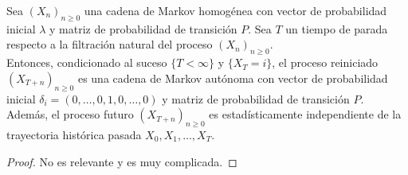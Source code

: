 \begin{teo}
    Sea $(X_n)_{n \geq 0}$ una cadena de Markov homogénea con vector de probabilidad inicial $\lambda$ y matriz de probabilidad de transición $P$. Sea $T$ un tiempo de parada respecto a la filtración natural del proceso $(X_n)_{n \geq 0}$. \\

    \noindent
    Entonces, condicionado al suceso $\{T < \infty\}$ y $\{X_T = i\}$, el proceso reiniciado $(X_{T+n})_{n \geq 0}$ es una cadena de Markov autónoma con vector de probabilidad inicial $\delta_i = (0, \dots, 0, 1, 0, \dots, 0)$ y matriz de probabilidad de transición $P$. Además, el proceso futuro $(X_{T+n})_{n \geq 0}$ es estadísticamente independiente de la trayectoria histórica pasada $X_0, X_1, \dots, X_T$.
\begin{proof}
    No es relevante y es muy complicada.



\end{proof}
\end{teo}
